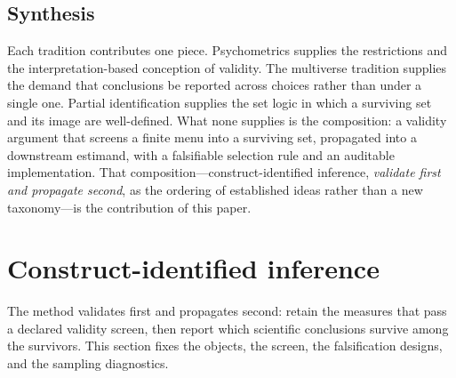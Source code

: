 \documentclass[10pt,letterpaper]{article}
\newcommand{\LLM}{\textsc{llm}}
\newcommand{\cvp}{\texttt{cvprofiles}}
\newcommand{\E}{\mathbb{E}}
\begin{document}
\subsection{Synthesis}
Each tradition contributes one piece.
Psychometrics supplies the restrictions and the interpretation-based conception of validity.
The multiverse tradition supplies the demand that conclusions be reported across choices rather than under a single one.
Partial identification supplies the set logic in which a surviving set and its image are well-defined.
What none supplies is the composition: a validity argument that screens a finite menu into a surviving set, propagated into a downstream estimand, with a falsifiable selection rule and an auditable implementation.
That composition---construct-identified inference, \emph{validate first and propagate second}, as the ordering of established ideas rather than a new taxonomy---is the contribution of this paper.

\section{Construct-identified inference}
\label{sec:construct}

The method validates first and propagates second: retain the measures that pass a declared validity screen, then report which scientific conclusions survive among the survivors.
This section fixes the objects, the screen, the falsification designs, and the sampling diagnostics.
\end{document}
